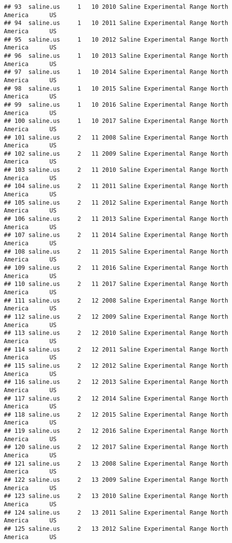 \documentclass[]{article}
\begin{document}
\begin{verbatim}
## 93  saline.us     1   10 2010 Saline Experimental Range North America      US
## 94  saline.us     1   10 2011 Saline Experimental Range North America      US
## 95  saline.us     1   10 2012 Saline Experimental Range North America      US
## 96  saline.us     1   10 2013 Saline Experimental Range North America      US
## 97  saline.us     1   10 2014 Saline Experimental Range North America      US
## 98  saline.us     1   10 2015 Saline Experimental Range North America      US
## 99  saline.us     1   10 2016 Saline Experimental Range North America      US
## 100 saline.us     1   10 2017 Saline Experimental Range North America      US
## 101 saline.us     2   11 2008 Saline Experimental Range North America      US
## 102 saline.us     2   11 2009 Saline Experimental Range North America      US
## 103 saline.us     2   11 2010 Saline Experimental Range North America      US
## 104 saline.us     2   11 2011 Saline Experimental Range North America      US
## 105 saline.us     2   11 2012 Saline Experimental Range North America      US
## 106 saline.us     2   11 2013 Saline Experimental Range North America      US
## 107 saline.us     2   11 2014 Saline Experimental Range North America      US
## 108 saline.us     2   11 2015 Saline Experimental Range North America      US
## 109 saline.us     2   11 2016 Saline Experimental Range North America      US
## 110 saline.us     2   11 2017 Saline Experimental Range North America      US
## 111 saline.us     2   12 2008 Saline Experimental Range North America      US
## 112 saline.us     2   12 2009 Saline Experimental Range North America      US
## 113 saline.us     2   12 2010 Saline Experimental Range North America      US
## 114 saline.us     2   12 2011 Saline Experimental Range North America      US
## 115 saline.us     2   12 2012 Saline Experimental Range North America      US
## 116 saline.us     2   12 2013 Saline Experimental Range North America      US
## 117 saline.us     2   12 2014 Saline Experimental Range North America      US
## 118 saline.us     2   12 2015 Saline Experimental Range North America      US
## 119 saline.us     2   12 2016 Saline Experimental Range North America      US
## 120 saline.us     2   12 2017 Saline Experimental Range North America      US
## 121 saline.us     2   13 2008 Saline Experimental Range North America      US
## 122 saline.us     2   13 2009 Saline Experimental Range North America      US
## 123 saline.us     2   13 2010 Saline Experimental Range North America      US
## 124 saline.us     2   13 2011 Saline Experimental Range North America      US
## 125 saline.us     2   13 2012 Saline Experimental Range North America      US

\end{verbatim}
\end{document}
